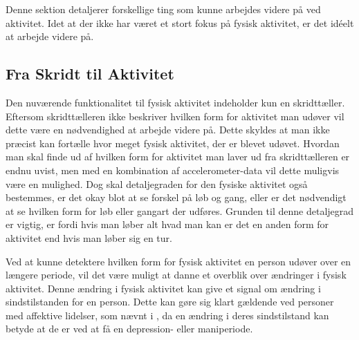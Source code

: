 Denne sektion detaljerer forskellige ting som kunne arbejdes videre på ved aktivitet.
Idet at der ikke har været et stort fokus på fysisk aktivitet, er det idéelt at arbejde videre på.

\subsection{Fra Skridt til Aktivitet}
Den nuværende funktionalitet til fysisk aktivitet indeholder kun en skridttæller.
Eftersom skridttælleren ikke beskriver hvilken form for aktivitet man udøver vil dette være en nødvendighed at arbejde videre på.
Dette skyldes at man ikke præcist kan fortælle hvor meget fysisk aktivitet, der er blevet udøvet.
Hvordan man skal finde ud af hvilken form for aktivitet man laver ud fra skridttælleren er endnu uvist, men med en kombination af accelerometer-data vil dette muligvis være en mulighed.
Dog skal detaljegraden for den fysiske aktivitet også bestemmes, er det okay blot at se forskel på løb og gang, eller er det nødvendigt at se hvilken form for løb eller gangart der udføres.
Grunden til denne detaljegrad er vigtig, er fordi hvis man løber alt hvad man kan er det en anden form for aktivitet end hvis man løber sig en tur.

Ved at kunne detektere hvilken form for fysisk aktivitet en person udøver over en længere periode, vil det være muligt at danne et overblik over ændringer i fysisk aktivitet.
Denne ændring i fysisk aktivitet kan give et signal om ændring i sindstilstanden for en person.
Dette kan gøre sig klart gældende ved personer med affektive lidelser, som nævnt i \citet[1.4 Møde med Psykiatri professor Jørgen Aagaard]{misc:faellesrapp}, da en ændring i deres sindstilstand kan betyde at de er ved at få en depression- eller maniperiode.

\begin{comment}
Den nuværende funktionalitet til fysisk aktivitet er kun en skridttæller, fra denne vil det næste logiske skridt være at lave noget der kan give et overblik over hvor meget fysisk aktivitet der har været ud fra antallet af skridt.
Helt præcist hvordan dette skal gøres og vises er uvist, men der er en mulighed for at det skulle kombineres med accelerometer data til at afgøre om der er tale om løb, gang eller anden form for bevægelse.
De forskellige gang typer skal så også fortolkes som forskellige form for aktivitet. 
Det ville også være nødvendigt at beslutte hvad for en enhed fysisk aktivitet er i, er det i Joule forbrændt eller noget andet?

Udover at beslutte hvordan fysisk aktivitet skal bestemmes skal man også beslutte sig for hvad det skal bruges til.
I sammenhæng med det primære fokus vi har på affektive lidelser, vil et oplagt fokus være at se på ændringer i mængden af fysisk aktivitet, da det giver et signal om ændringer i sindstilstand for patienter med affektive lidelser, hvilket også blev nævnt i \citet[Kapitel 1, Sektion 4]{misc:faellesrapp}.
\end{comment}
